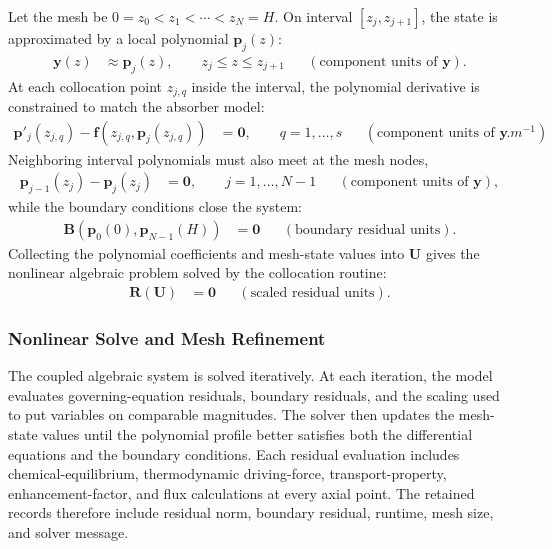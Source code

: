                 Let the mesh be $0=z_0<z_1<\cdots<z_N=H$. On interval $[z_j,z_{j+1}]$, the state is approximated by a local polynomial $\mathbf{p}_j(z)$:
                \begin{align}
                    \mathbf{y}(z) &\approx \mathbf{p}_j(z),
                    \qquad z_j \le z \le z_{j+1}
                    && \left(\text{component units of }\mathbf{y}\right).
                \end{align}
                At each collocation point $z_{j,q}$ inside the interval, the polynomial derivative is constrained to match the absorber model:
                \begin{align}
                    \mathbf{p}'_j(z_{j,q})
                    -\mathbf{f}\left(z_{j,q},\mathbf{p}_j(z_{j,q})\right)
                    &= \mathbf{0},
                    \qquad q=1,\ldots,s
                    && \left(\text{component units of }\mathbf{y}\,\unit{m^{-1}}\right).
                \end{align}
                Neighboring interval polynomials must also meet at the mesh nodes,
                \begin{align}
                    \mathbf{p}_{j-1}(z_j)-\mathbf{p}_{j}(z_j)
                    &=\mathbf{0},
                    \qquad j=1,\ldots,N-1
                    && \left(\text{component units of }\mathbf{y}\right),
                \end{align}
                while the boundary conditions close the system:
                \begin{align}
                    \mathbf{B}\left(\mathbf{p}_0(0),\mathbf{p}_{N-1}(H)\right)
                    &= \mathbf{0}
                    && \left(\text{boundary residual units}\right).
                \end{align}
                Collecting the polynomial coefficients and mesh-state values into $\mathbf{U}$ gives the nonlinear algebraic problem solved by the collocation routine:
                \begin{align}
                    \mathbf{R}(\mathbf{U}) &= \mathbf{0}
                    && \left(\text{scaled residual units}\right).
                \end{align}

            \subsubsection*{Nonlinear Solve and Mesh Refinement}
                The coupled algebraic system is solved iteratively. At each iteration, the model evaluates governing-equation residuals, boundary residuals, and the scaling used to put variables on comparable magnitudes. The solver then updates the mesh-state values until the polynomial profile better satisfies both the differential equations and the boundary conditions. Each residual evaluation includes chemical-equilibrium, thermodynamic driving-force, transport-property, enhancement-factor, and flux calculations at every axial point. The retained records therefore include residual norm, boundary residual, runtime, mesh size, and solver message.

